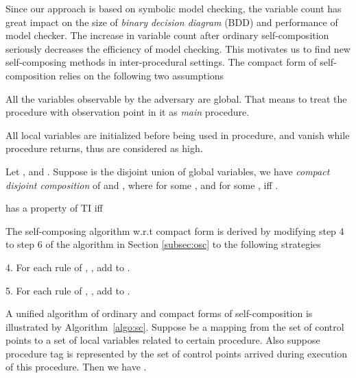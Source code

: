 \documentclass{llncs}
\begin{document}
Since our approach is based on symbolic model checking, the variable
count has great impact on the size of \emph{binary decision diagram}
(BDD) and performance of model checker. The increase in variable
count after ordinary self-composition seriously decreases the
efficiency of model checking. This motivates us to find new
self-composing methods in inter-procedural settings. The compact
form of self-composition relies on the following two assumptions
\begin{compactitem}
\item All the variables observable by the adversary are global. That
means to treat the procedure with observation point in it as
\emph{main} procedure.
\item All local variables are initialized before being used
in procedure, and vanish while procedure returns, thus are
considered as \textsf{high}.
\end{compactitem}
Let
,
and . Suppose  is the disjoint union
of global variables, we have \emph{compact disjoint composition}
 of  and ,
where  for some , and  for some , iff .
\begin{definition}
 has a property of TI iff\\
\hspace*{\fill}\hspace*{\fill}
\end{definition}

The self-composing algorithm w.r.t compact form is derived by
modifying step 4 to step 6 of the algorithm in Section
\ref{subsec:osc} to the following strategies
\begin{compactenum}
\item[4.] For each rule of , , add
 to .
\item[5.] For each rule of , , add
 to .
\end{compactenum}

A unified algorithm of ordinary and compact forms of
self-composition is illustrated by Algorithm~\ref{algo:sc}. Suppose
 be a mapping from the
set of control points to a set of local variables related to certain
procedure. Also suppose procedure tag  is represented by the
set of control points arrived during execution of this procedure.
Then we have .
\end{document}
